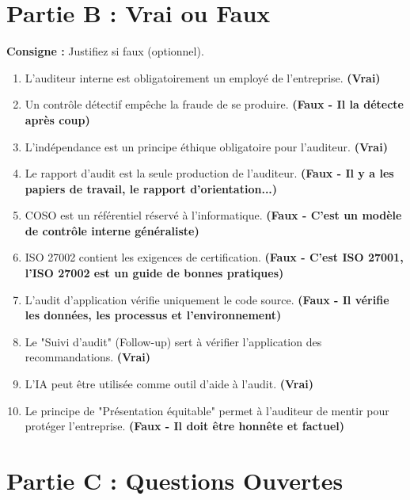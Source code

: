 \section{Partie B : Vrai ou Faux}

\textbf{Consigne :} Justifiez si faux (optionnel).

\begin{enumerate}
    \item L'auditeur interne est obligatoirement un employé de l'entreprise. \textbf{(Vrai)}
    \item Un contrôle détectif empêche la fraude de se produire. \textbf{(Faux - Il la détecte après coup)}
    \item L'indépendance est un principe éthique obligatoire pour l'auditeur. \textbf{(Vrai)}
    \item Le rapport d'audit est la seule production de l'auditeur. \textbf{(Faux - Il y a les papiers de travail, le rapport d'orientation...)}
    \item COSO est un référentiel réservé à l'informatique. \textbf{(Faux - C'est un modèle de contrôle interne généraliste)}
    \item ISO 27002 contient les exigences de certification. \textbf{(Faux - C'est ISO 27001, l'ISO 27002 est un guide de bonnes pratiques)}
    \item L'audit d'application vérifie uniquement le code source. \textbf{(Faux - Il vérifie les données, les processus et l'environnement)}
    \item Le "Suivi d'audit" (Follow-up) sert à vérifier l'application des recommandations. \textbf{(Vrai)}
    \item L'IA peut être utilisée comme outil d'aide à l'audit. \textbf{(Vrai)}
    \item Le principe de "Présentation équitable" permet à l'auditeur de mentir pour protéger l'entreprise. \textbf{(Faux - Il doit être honnête et factuel)}
\end{enumerate}

\section{Partie C : Questions Ouvertes}

